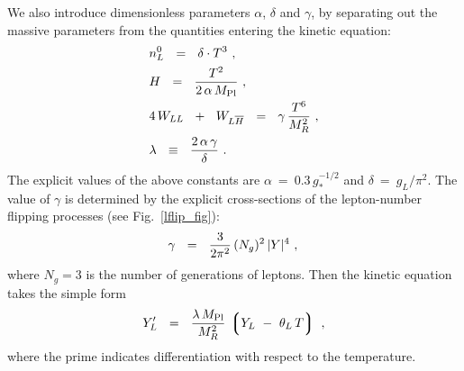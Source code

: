 \documentclass[12pt]{revtex4}
\newcommand{\lgr}{\left\lgroup}
\newcommand{\rgr}{\right\rgroup}
\newcommand{\Mpl}{M_{\rm Pl}}
\newcommand{\ov}{\overline}
\begin{document}
	We also introduce dimensionless parameters $ \alpha $, 
	$ \delta $ and $ \gamma $, by separating out the massive
	parameters from the quantities entering the kinetic equation:
\begin{align*}
&	 n_L^0 ~~=~~   \delta \cdot T^3~, \\
&	H     ~~=~~   \frac{T^2}{2\, \alpha\, \Mpl}~, \\
&	4\, W_{LL} ~~+~~ W_{L\ov{H}} ~~=~~ 
		 \gamma\, \frac{T^6}{M_R^2}~, \\
&	\lambda ~~\equiv~~  \frac{2\,\alpha\,\gamma}{\delta} ~.
\end{align*}
	The explicit values of the above constants are
	$ \alpha  ~=~ 0.3\, g_*^{-1/2} $ and 
	$ \delta  ~=~ g_L/\pi^2 $.
	The value of $ \gamma $ is determined by the explicit 
	cross-sections of the lepton-number flipping processes
	(see Fig.~\ref{lflip_fig}):
\[
	\gamma  ~~=~~ \frac{3}{2\pi^2}\, (N_g)^2\, |Y|^4~, \\
\]
	where $ N_g = 3 $ is the number of generations of leptons.
	Then the kinetic equation takes the simple form
\begin{equation}
\label{btz_simple}
	Y_L' ~~=~~ \frac{\lambda\,\Mpl}{M_R^2} \,
			\lgr Y_L ~-~ \theta_L\, T \rgr~,
\end{equation}
	where the prime indicates differentiation with respect to
	the temperature.
	
\end{document}
